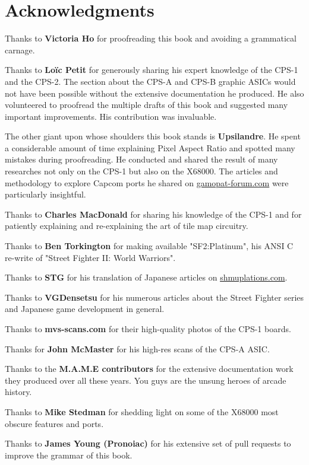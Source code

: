 \chapter*{Acknowledgments} 

Thanks to \textbf{Victoria Ho} for proofreading this book and avoiding a grammatical carnage.

Thanks to \textbf{Lo\"{i}c Petit} for generously sharing his expert knowledge of the CPS-1 and the CPS-2. The section about the CPS-A and CPS-B graphic ASICs would not have been possible without the extensive documentation he produced. He also volunteered to proofread the multiple drafts of this book and suggested many important improvements. His contribution was invaluable.

The other giant upon whose shoulders this book stands is \textbf{Upsilandre}. He spent a considerable amount of time explaining Pixel Aspect Ratio and spotted many mistakes during proofreading. He conducted and shared the result of many researches not only on the CPS-1 but also on the X68000. The articles and methodology to explore Capcom ports he shared on \href{https://www.gamopat-forum.com}{gamopat-forum.com} were particularly insightful.

Thanks to \textbf{Charles MacDonald} for sharing his knowledge of the CPS-1 and for patiently explaining and re-explaining the art of tile map circuitry.

Thanks to \textbf{Ben Torkington} for making available "SF2:Platinum", his ANSI C re-write of "Street Fighter II: World Warriors".

Thanks to \textbf{STG} for his translation of Japanese articles on \href{https://shmuplations.com}{shmuplations.com}.

Thanks to \textbf{VGDensetsu} for his numerous articles about the Street Fighter series and Japanese game development in general.

Thanks to \textbf{mvs-scans.com} for their high-quality photos of the CPS-1 boards.

Thanks for \textbf{John McMaster} for his high-res scans of the CPS-A ASIC.

Thanks to the \textbf{M.A.M.E contributors} for the extensive documentation work they produced over all these years. You guys are the unsung heroes of arcade history.

Thanks to \textbf{Mike Stedman} for shedding light on some of the X68000 most obscure features and ports.

Thanks to \textbf{James Young (Pronoiac)} for his extensive set of pull requests to improve the grammar of this book.